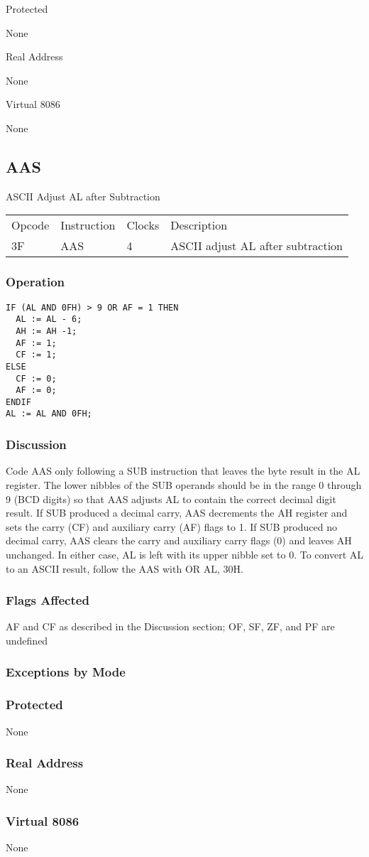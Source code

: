 Protected

None

Real Address

None

Virtual 8086

None

\subsection*{AAS}

ASCII Adjust AL after Subtraction

\begin{tabular}{l l l l}
Opcode & Instruction & Clocks & Description\\
3F & AAS & 4 & ASCII adjust AL after subtraction\\
\end{tabular}

\subsubsection{Operation}
\begin{verbatim}
IF (AL AND 0FH) > 9 OR AF = 1 THEN
  AL := AL - 6;
  AH := AH -1;
  AF := 1;
  CF := 1;
ELSE
  CF := 0;
  AF := 0;
ENDIF
AL := AL AND 0FH;
\end{verbatim}

\subsubsection{Discussion}
Code AAS only following a SUB instruction that leaves the byte result in the AL register. The lower nibbles of the SUB operands should be in the range 0 through 9 (BCD digits) so that AAS adjusts AL to contain the correct decimal digit result. If SUB produced a decimal carry, AAS decrements the AH register and sets the carry (CF) and auxiliary carry (AF) flags to 1. If SUB produced no decimal carry, AAS clears the carry and auxiliary carry flags (0) and leaves AH unchanged. In either case, AL is left with its upper nibble set to 0. To convert AL to an ASCII result, follow the AAS with OR AL, 30H.

\subsubsection{Flags Affected}

AF and CF as described in the Discussion section; OF, SF, ZF, and PF are undefined

\subsubsection{Exceptions by Mode}

\subsubsection{Protected}

None

\subsubsection{Real Address}

None

\subsubsection{Virtual 8086}

None
